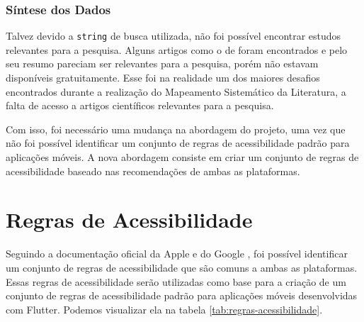 \subsubsection{Síntese dos Dados}

Talvez devido a \texttt{string} de busca utilizada, não foi possível encontrar estudos relevantes para a pesquisa. Alguns artigos como o de \cite{mobileaccessibilityguidelinesadpotion} foram encontrados e pelo seu resumo pareciam ser relevantes para a pesquisa, porém não estavam disponíveis gratuitamente. Esse foi na realidade um dos maiores desafios encontrados durante a realização do Mapeamento Sistemático da Literatura, a falta de acesso a artigos científicos relevantes para a pesquisa.

Com isso, foi necessário uma mudança na abordagem do projeto, uma vez que não foi possível identificar um conjunto de regras de acessibilidade padrão para aplicações móveis. A nova abordagem consiste em criar um conjunto de regras de acessibilidade baseado nas recomendações de ambas as plataformas.

\section{Regras de Acessibilidade}

Seguindo a documentação oficial da Apple \cite{iosaccessibility} e do Google \cite{androidaccessibility}, foi possível identificar um conjunto de regras de acessibilidade que são comuns a ambas as plataformas. Essas regras de acessibilidade serão utilizadas como base para a criação de um conjunto de regras de acessibilidade padrão para aplicações móveis desenvolvidas com Flutter. Podemos visualizar ela na tabela \ref{tab:regras-acessibilidade}.

\renewcommand{\thera}{RA\arabic{ra}}

